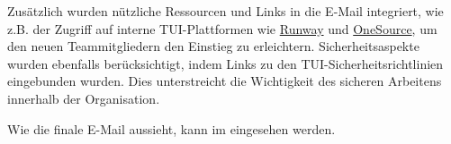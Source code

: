 Zusätzlich wurden nützliche Ressourcen und Links in die E-Mail integriert, wie z.B. der Zugriff auf interne TUI-Plattformen wie  \hyperlink{Runway}{\textcolor{AOBlau}{Runway}} und \hyperlink{OneSource}{\textcolor{AOBlau}{OneSource}}, um den neuen Teammitgliedern den Einstieg zu erleichtern. Sicherheitsaspekte wurden ebenfalls berücksichtigt, indem Links zu den TUI-Sicherheitsrichtlinien eingebunden wurden. Dies unterstreicht die Wichtigkeit des sicheren Arbeitens innerhalb der Organisation.

Wie die finale E-Mail aussieht, kann im  eingesehen werden.
